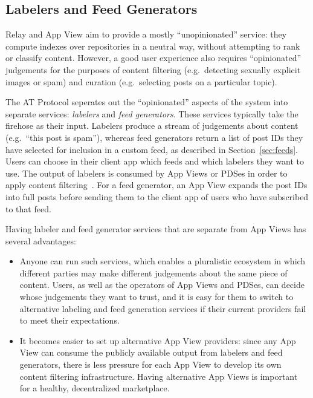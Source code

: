 \documentclass[sigconf,nonacm]{acmart}
\begin{document}

\subsection{Labelers and Feed Generators}\label{sec:labeling}

Relay and App View aim to provide a mostly ``unopinionated'' service: they compute indexes over repositories in a neutral way, without attempting to rank or classify content.
However, a good user experience also requires ``opinionated'' judgements for the purposes of content filtering (e.g.\ detecting sexually explicit images or spam) and curation (e.g.\ selecting posts on a particular topic).

The AT Protocol seperates out the ``opinionated'' aspects of the system into separate services: \emph{labelers} and \emph{feed generators}.
These services typically take the firehose as their input.
Labelers produce a stream of judgements about content (e.g.\ ``this post is spam''), whereas feed generators return a list of post IDs they have selected for inclusion in a custom feed, as described in Section~\ref{sec:feeds}.
Users can choose in their client app which feeds and which labelers they want to use.
The output of labelers is consumed by App Views or PDSes in order to apply content filtering~\cite{Labeling}.
For a feed generator, an App View expands the post IDs into full posts before sending them to the client app of users who have subscribed to that feed.

Having labeler and feed generator services that are separate from App Views has several advantages:
\begin{itemize}
    \item Anyone can run such services, which enables a pluralistic ecosystem in which different parties may make different judgements about the same piece of content.
        Users, as well as the operators of App Views and PDSes, can decide whose judgements they want to trust, and it is easy for them to switch to alternative labeling and feed generation services if their current providers fail to meet their expectations.
    \item It becomes easier to set up alternative App View providers: since any App View can consume the publicly available output from labelers and feed generators, there is less pressure for each App View to develop its own content filtering infrastructure.
        Having alternative App Views is important for a healthy, decentralized marketplace.
\end{itemize}
\end{document}
